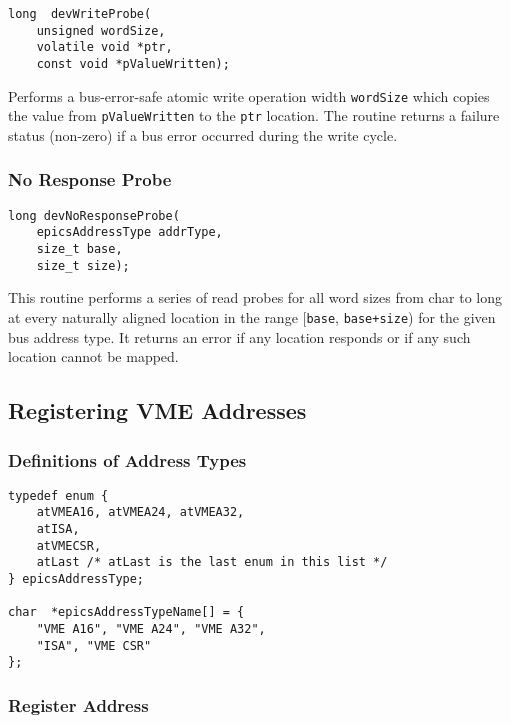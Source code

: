 \begin{verbatim}
long  devWriteProbe(
    unsigned wordSize,
    volatile void *ptr,
    const void *pValueWritten);
\end{verbatim}

Performs a bus-error-safe atomic write operation width \verb|wordSize| which copies the value from \verb|pValueWritten| to the 
\verb|ptr| location. The routine returns a failure status (non-zero) if a bus error occurred during the write cycle.

\subsubsection{No Response Probe}

\begin{verbatim}
long devNoResponseProbe(
    epicsAddressType addrType,
    size_t base,
    size_t size);
\end{verbatim}

This routine performs a series of read probes for all word sizes from char to long at every naturally aligned location in the 
range [\verb|base|, \verb|base+size|) for the given bus address type. It returns an error if any location responds or if any such 
location cannot be mapped.

\subsection{Registering VME Addresses}

\subsubsection{Definitions of Address Types}

\begin{verbatim}
typedef enum {
    atVMEA16, atVMEA24, atVMEA32,
    atISA,
    atVMECSR,
    atLast /* atLast is the last enum in this list */
} epicsAddressType;

char  *epicsAddressTypeName[] = {
    "VME A16", "VME A24", "VME A32",
    "ISA", "VME CSR"
};
\end{verbatim}

\subsubsection{Register Address}

